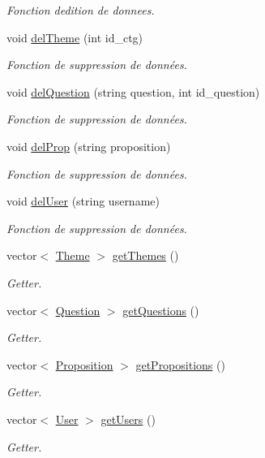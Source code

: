 \begin{DoxyCompactItemize}
\begin{DoxyCompactList}\small\item\em Fonction d\textquotesingle{}edition de donnees. \end{DoxyCompactList}\item 
void \mbox{\hyperlink{classDatabase_a1b99f71f520f57eb4dc53e7ad709660e}{del\+Theme}} (int id\+\_\+ctg)
\begin{DoxyCompactList}\small\item\em Fonction de suppression de données. \end{DoxyCompactList}\item 
void \mbox{\hyperlink{classDatabase_a67a8d9eaa8a34e98606cf5233cbaa77f}{del\+Question}} (string question, int id\+\_\+question)
\begin{DoxyCompactList}\small\item\em Fonction de suppression de données. \end{DoxyCompactList}\item 
void \mbox{\hyperlink{classDatabase_a58ea1f635ec948e38bdbcfec9dd98a5e}{del\+Prop}} (string proposition)
\begin{DoxyCompactList}\small\item\em Fonction de suppression de données. \end{DoxyCompactList}\item 
void \mbox{\hyperlink{classDatabase_a6c40c150a977a2c4c4a1c01fe48e7c71}{del\+User}} (string username)
\begin{DoxyCompactList}\small\item\em Fonction de suppression de données. \end{DoxyCompactList}\item 
vector$<$ \mbox{\hyperlink{classTheme}{Theme}} $>$ \mbox{\hyperlink{classDatabase_a4cc8ad17cfd1cbf1074e56aa1e2eb71d}{get\+Themes}} ()
\begin{DoxyCompactList}\small\item\em Getter. \end{DoxyCompactList}\item 
vector$<$ \mbox{\hyperlink{classQuestion}{Question}} $>$ \mbox{\hyperlink{classDatabase_ae1aff982221c7ed188e1ce3ed00f878d}{get\+Questions}} ()
\begin{DoxyCompactList}\small\item\em Getter. \end{DoxyCompactList}\item 
vector$<$ \mbox{\hyperlink{classProposition}{Proposition}} $>$ \mbox{\hyperlink{classDatabase_a19e779ae9923798268d4b7052b09a76f}{get\+Propositions}} ()
\begin{DoxyCompactList}\small\item\em Getter. \end{DoxyCompactList}\item 
vector$<$ \mbox{\hyperlink{classUser}{User}} $>$ \mbox{\hyperlink{classDatabase_a78d088be3546d65b81e532d931a90f22}{get\+Users}} ()
\begin{DoxyCompactList}\small\item\em Getter. \end{DoxyCompactList}\end{DoxyCompactItemize}


